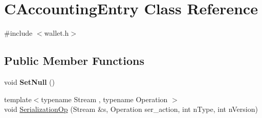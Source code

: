 \hypertarget{class_c_accounting_entry}{}\section{C\+Accounting\+Entry Class Reference}
\label{class_c_accounting_entry}


{\ttfamily \#include $<$wallet.\+h$>$}

\subsection*{Public Member Functions}
\begin{DoxyCompactItemize}
\item 
\mbox{\label{class_c_accounting_entry_a439b044226a1e465032ce4c4580d3389}} 
void {\bfseries Set\+Null} ()
\item 
{\footnotesize template$<$typename Stream , typename Operation $>$ }\\void \mbox{\hyperlink{class_c_accounting_entry_ab30195f9f97f8f7ceb17360c24a39676}{Serialization\+Op}} (Stream \&s, Operation ser\+\_\+action, int n\+Type, int n\+Version)
\end{DoxyCompactItemize}
